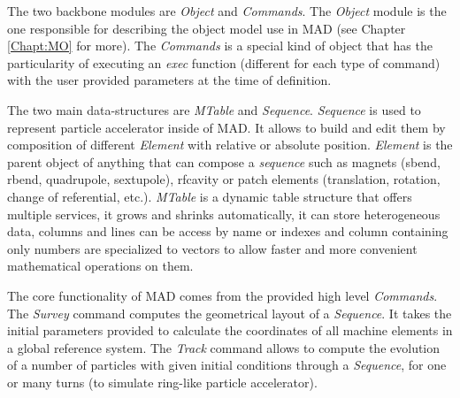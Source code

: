 The two backbone modules are \emph{Object} and \emph{Commands}. The \emph{Object}
module is the one responsible for describing the object model use in MAD (see
Chapter \ref{Chapt:MO} for more). The \emph{Commands} is a special kind of
object that has the particularity of executing an \emph{exec} function
(different for each type of command) with the user provided parameters at the
time of definition.

The two main data-structures are \emph{MTable} and \emph{Sequence}.
\emph{Sequence} is used to represent particle accelerator inside of MAD.
It allows to build and edit them by
composition of different \emph{Element} with relative or absolute position.
\emph{Element} is the parent object of anything that can compose a
\emph{sequence} such as magnets (sbend, rbend, quadrupole, sextupole),
rfcavity or patch elements (translation, rotation, change of referential,
etc.). \emph{MTable} is a dynamic table structure that offers multiple
services, it grows and shrinks automatically, it can store heterogeneous data,
columns and lines can be access by name or indexes and column containing only
numbers are specialized to vectors to allow faster and more convenient
mathematical operations on them.

The core functionality of MAD comes from the provided high level \emph{Commands}.
The \emph{Survey} command computes the geometrical layout of a \emph{Sequence}.
It takes the initial parameters provided to calculate the coordinates of all
machine elements in a global reference system. The \emph{Track} command allows
to compute the evolution of a number of particles with given initial conditions
through a \emph{Sequence}, for one or many turns (to simulate ring-like particle
accelerator).